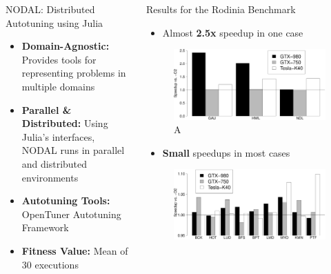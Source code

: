 \documentclass{beamer}
\begin{document}
\begin{frame}
\begin{columns}[t]
\begin{column}{.46\linewidth}
\begin{block}{\Large NODAL: Distributed Autotuning using Julia}
            \begin{itemize}
                \item \textbf{Domain-Agnostic:} Provides tools for representing
                    problems in multiple domains
                \item \textbf{Parallel \& Distributed:} Using Julia's interfaces,
                    NODAL runs in parallel and distributed environments
                \item \textbf{Autotuning Tools:} OpenTuner Autotuning Framework
                \item \textbf{Fitness Value:} Mean of 30 executions
            \end{itemize}
        \end{block}
    \end{column}
    \begin{column}{.46\linewidth}
        \begin{block}{\Large Results for the Rodinia Benchmark}
            \begin{itemize}
                \item \large{Almost \textbf{2.5x} speedup in one case}
            \end{itemize}
            \begin{figure}[htpb]
                \includegraphics[width=0.84\linewidth]{RodiniaSummary.eps}
                \caption{A}
            \end{figure}
            \begin{itemize}
                \item \large{\textbf{Small} speedups in most cases}
            \end{itemize}
            \begin{figure}[htpb]
                \includegraphics[width=0.84\linewidth]{RodiniaSummary_small.eps}

\end{figure}
\end{block}
\end{column}
\end{columns}
\end{frame}
\end{document}
